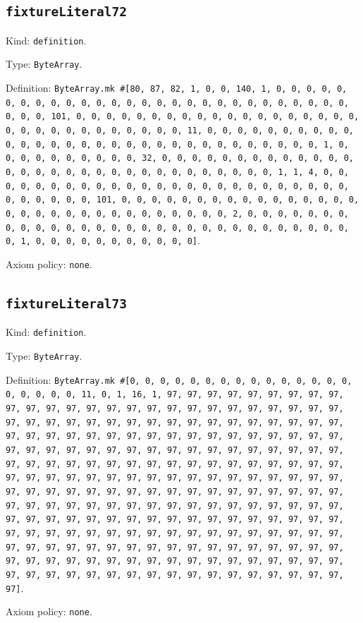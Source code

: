 \documentclass[11pt]{article}
\begin{document}
\subsection*{\texttt{fixtureLiteral72}}
\noindent Kind: \texttt{definition}.\par
\noindent Type: \texttt{ByteArray}.\par
\noindent Definition: \texttt{ByteArray.mk \#[80, 87, 82, 1, 0, 0, 140, 1, 0, 0, 0, 0, 0, 0, 0, 0, 0, 0, 0, 0, 0, 0, 0, 0, 0, 0, 0, 0, 0, 0, 0, 0, 0, 0, 0, 0, 0, 0, 0, 101, 0, 0, 0, 0, 0, 0, 0, 0, 0, 0, 0, 0, 0, 0, 0, 0, 0, 0, 0, 0, 0, 0, 0, 0, 0, 0, 0, 0, 0, 0, 0, 11, 0, 0, 0, 0, 0, 0, 0, 0, 0, 0, 0, 0, 0, 0, 0, 0, 0, 0, 0, 0, 0, 0, 0, 0, 0, 0, 0, 0, 0, 0, 0, 1, 0, 0, 0, 0, 0, 0, 0, 0, 0, 0, 32, 0, 0, 0, 0, 0, 0, 0, 0, 0, 0, 0, 0, 0, 0, 0, 0, 0, 0, 0, 0, 0, 0, 0, 0, 0, 0, 0, 0, 0, 0, 0, 1, 1, 4, 0, 0, 0, 0, 0, 0, 0, 0, 0, 0, 0, 0, 0, 0, 0, 0, 0, 0, 0, 0, 0, 0, 0, 0, 0, 0, 0, 0, 0, 0, 0, 101, 0, 0, 0, 0, 0, 0, 0, 0, 0, 0, 0, 0, 0, 0, 0, 0, 0, 0, 0, 0, 0, 0, 0, 0, 0, 0, 0, 0, 0, 0, 0, 2, 0, 0, 0, 0, 0, 0, 0, 0, 0, 0, 0, 0, 0, 0, 0, 0, 0, 0, 0, 0, 0, 0, 0, 0, 0, 0, 0, 0, 0, 0, 0, 1, 0, 0, 0, 0, 0, 0, 0, 0, 0, 0, 0]}.\par
\noindent Axiom policy: \texttt{none}.\par
\subsection*{\texttt{fixtureLiteral73}}
\noindent Kind: \texttt{definition}.\par
\noindent Type: \texttt{ByteArray}.\par
\noindent Definition: \texttt{ByteArray.mk \#[0, 0, 0, 0, 0, 0, 0, 0, 0, 0, 0, 0, 0, 0, 0, 0, 0, 0, 0, 0, 11, 0, 1, 16, 1, 97, 97, 97, 97, 97, 97, 97, 97, 97, 97, 97, 97, 97, 97, 97, 97, 97, 97, 97, 97, 97, 97, 97, 97, 97, 97, 97, 97, 97, 97, 97, 97, 97, 97, 97, 97, 97, 97, 97, 97, 97, 97, 97, 97, 97, 97, 97, 97, 97, 97, 97, 97, 97, 97, 97, 97, 97, 97, 97, 97, 97, 97, 97, 97, 97, 97, 97, 97, 97, 97, 97, 97, 97, 97, 97, 97, 97, 97, 97, 97, 97, 97, 97, 97, 97, 97, 97, 97, 97, 97, 97, 97, 97, 97, 97, 97, 97, 97, 97, 97, 97, 97, 97, 97, 97, 97, 97, 97, 97, 97, 97, 97, 97, 97, 97, 97, 97, 97, 97, 97, 97, 97, 97, 97, 97, 97, 97, 97, 97, 97, 97, 97, 97, 97, 97, 97, 97, 97, 97, 97, 97, 97, 97, 97, 97, 97, 97, 97, 97, 97, 97, 97, 97, 97, 97, 97, 97, 97, 97, 97, 97, 97, 97, 97, 97, 97, 97, 97, 97, 97, 97, 97, 97, 97, 97, 97, 97, 97, 97, 97, 97, 97, 97, 97, 97, 97, 97, 97, 97, 97, 97, 97, 97, 97, 97, 97, 97, 97, 97, 97, 97, 97, 97, 97, 97, 97, 97, 97, 97, 97, 97, 97, 97, 97, 97, 97, 97, 97, 97, 97, 97, 97, 97, 97, 97, 97, 97, 97, 97, 97, 97]}.\par
\noindent Axiom policy: \texttt{none}.\par
\end{document}
